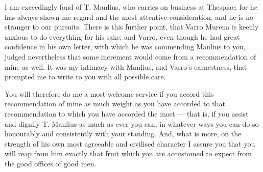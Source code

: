 

 I am exceedingly fond of T. Manlius, who carries on business at Thespiae; for he has always shown me regard and the most attentive consideration, and he is no stranger to our pursuits. There is this further point, that Varro Murena is keenly anxious to do everything for his sake; and Varro, even though he had great confidence in his own letter, with which he was commending Manlius to you, judged nevertheless that some increment would come from a recommendation of mine as well. It was my intimacy with Manlius, and Varro's earnestness, that prompted me to write to you with all possible care.

 You will therefore do me a most welcome service if you accord this recommendation of mine as much weight as you have accorded to that recommendation to which you have accorded the most --- that is, if you assist and dignify T. Manlius as much as ever you can, in whatever ways you can do so honourably and consistently with your standing. And, what is more, on the strength of his own most agreeable and civilised character I assure you that you will reap from him exactly that fruit which you are accustomed to expect from the good offices of good men.
